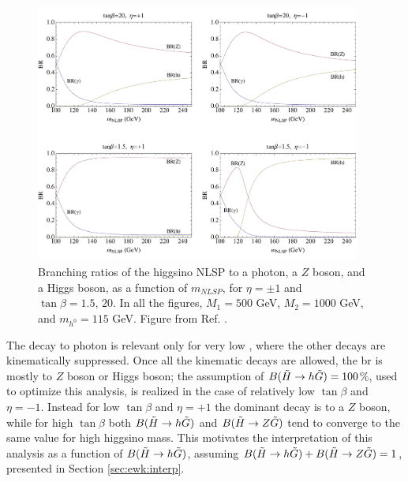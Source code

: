 \begin{figure}[h]
	\centering
	\includegraphics[width=0.95\textwidth]{figures/ewk_prod/varie/BRfracs}
\caption{Branching ratios of the higgsino NLSP to a photon, a $Z$ boson, and a Higgs boson, as a function of $m_{NLSP}$, for $\eta=\pm1$ and $\tan\beta=1.5,\,20$. In all the figures, $M_1=500$ GeV, $M_2=1000$ GeV, and $m_{h^0}=115$ GeV. Figure from Ref. \cite{Meade:2009qv}.}
\label{fig:higgsinoBR}
\end{figure}

The decay to photon is relevant only for very low \mhino, where the other decays are kinematically suppressed. 
Once all the kinematic decays are allowed, the \gls{br} is mostly to $Z$ boson or Higgs boson; 
the assumption of $B(\tilde{H}\rightarrow h \tilde{G}) = 100$\%, used to optimize this analysis, is 
realized in the case of relatively low $\tan \beta$ and $\eta = -1$.
Instead for low $\tan \beta$ and $\eta = +1$ the dominant decay is to a $Z$ boson, while for high 
$\tan \beta$ both $B(\tilde{H}\rightarrow h \tilde{G})$ and $B(\tilde{H}\rightarrow Z \tilde{G})$ tend to 
converge to the same value for high higgsino mass.
This motivates the interpretation of this analysis as a function of $B(\tilde{H}\rightarrow h \tilde{G})$, 
assuming $B(\tilde{H}\rightarrow h \tilde{G}) +B(\tilde{H}\rightarrow Z \tilde{G}) =1$, presented in Section \ref{sec:ewk:interp}.




